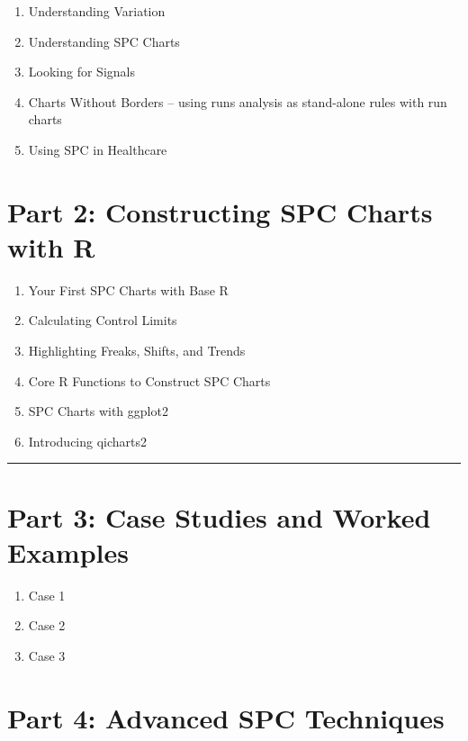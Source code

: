 \documentclass[
]{book}
\providecommand{\tightlist}{%
  \setlength{\itemsep}{0pt}\setlength{\parskip}{0pt}}
\begin{document}
\begin{enumerate}
\def\labelenumi{\arabic{enumi}.}
\tightlist
\item
  Understanding Variation
\item
  Understanding SPC Charts
\item
  Looking for Signals
\item
  Charts Without Borders -- using runs analysis as stand-alone rules with run charts
\item
  Using SPC in Healthcare
\end{enumerate}

\section*{Part 2: Constructing SPC Charts with R}\label{part-2-constructing-spc-charts-with-r}

\begin{enumerate}
\def\labelenumi{\arabic{enumi}.}
\tightlist
\item
  Your First SPC Charts with Base R
\item
  Calculating Control Limits
\item
  Highlighting Freaks, Shifts, and Trends
\item
  Core R Functions to Construct SPC Charts
\item
  SPC Charts with ggplot2
\item
  Introducing qicharts2
\end{enumerate}

\begin{center}\rule{0.5\linewidth}{0.5pt}\end{center}

\section*{Part 3: Case Studies and Worked Examples}\label{part-3-case-studies-and-worked-examples}

\begin{enumerate}
\def\labelenumi{\arabic{enumi}.}
\tightlist
\item
  Case 1
\item
  Case 2
\item
  Case 3
\end{enumerate}

\section*{Part 4: Advanced SPC Techniques}\label{part-4-advanced-spc-techniques}
\end{document}
